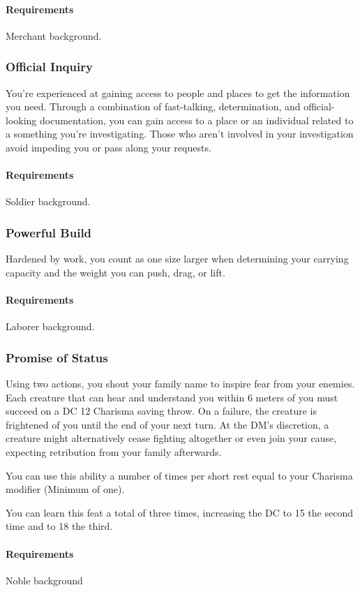     \paragraph{Requirements} Merchant background.
\subsubsection{Official Inquiry} \label{feat::officialinquiry}
    You're experienced at gaining access to people and places to get the information you need.
    Through a combination of fast-talking, determination, and official-looking documentation, you can gain access to a place or an individual related to a something you're investigating.
    Those who aren't involved in your investigation avoid impeding you or pass along your requests.
    \paragraph{Requirements} Soldier background.
\subsubsection{Powerful Build} \label{feat::powerfulbuild_bg}
    Hardened by work, you count as one size larger when determining your carrying capacity and the weight you can push, drag, or lift.
    \paragraph{Requirements} Laborer background.
\subsubsection{Promise of Status} \label{feat::promiseofstatus}
    Using two actions, you shout your family name to inspire fear from your enemies.
    Each creature that can hear and understand you within 6 meters of you must succeed on a DC 12 Charisma saving throw.
    On a failure, the creature is frightened of you until the end of your next turn.
    At the DM's discretion, a creature might alternatively cease fighting altogether or even join your cause, expecting retribution from your family afterwards.

    You can use this ability a number of times per short rest equal to your Charisma modifier (Minimum of one).

    You can learn this feat a total of three times, increasing the DC to 15 the second time and to 18 the third.
    \paragraph{Requirements} Noble background
